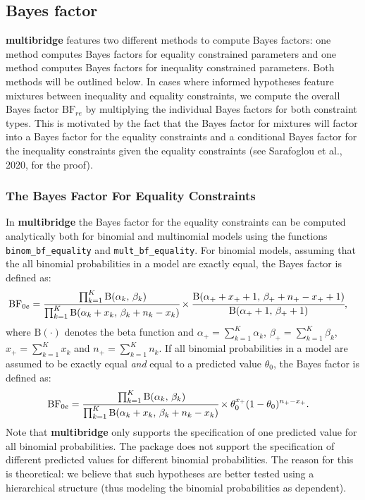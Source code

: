 \documentclass[
  english,
  man,floatsintext]{apa6}
\begin{document}
\hypertarget{bayes-factor}{%
\subsection{Bayes factor}\label{bayes-factor}}

\noindent \textbf{multibridge} features two different methods to compute Bayes factors: one method computes Bayes factors for equality constrained parameters and one method computes Bayes factors for inequality constrained parameters. Both methods will be outlined below. In cases where informed hypotheses feature mixtures between inequality and equality constraints, we compute the overall Bayes factor \(\text{BF}_{re}\) by multiplying the individual Bayes factors for both constraint types. This is motivated by the fact that the Bayes factor for mixtures will factor into a Bayes factor for the equality constraints and a conditional Bayes factor for the inequality constraints given the equality constraints (see Sarafoglou et al., 2020, for the proof).

\hypertarget{the-bayes-factor-for-equality-constraints}{%
\subsubsection{The Bayes Factor For Equality Constraints}\label{the-bayes-factor-for-equality-constraints}}

\noindent In \textbf{multibridge} the Bayes factor for the equality constraints can be computed analytically both for binomial and multinomial models using the functions \texttt{binom\_bf\_equality} and \texttt{mult\_bf\_equality}. For binomial models, assuming that the all binomial probabilities in a model are exactly equal, the Bayes factor is defined as:
\begin{align*}
\text{BF}_{0e}
&= \cfrac{\prod_{k=1}^K \text{B}(\alpha_k \text{, } \beta_k)}{\prod_{k=1}^K \text{B}(\alpha_k + x_k\text{, } \beta_k + n_k - x_k)} \times \cfrac{\text{B}(\alpha_+ + x_+ + 1\text{, } \beta_+ + n_+ - x_+ + 1)}{\text{B}(\alpha_+ + 1\text{, }\beta_+ + 1)},
\end{align*}
where \(\text{B}(\cdot)\) denotes the beta function and \(\alpha_+ = \sum_{k=1}^K\alpha_k\), \(\beta_+ = \sum_{k=1}^K\beta_k\), \(x_+ = \sum_{k=1}^K x_k\) and \(n_+ = \sum_{k=1}^K n_k\). If all binomial probabilities in a model are assumed to be exactly equal \textit{and} equal to a predicted value \(\theta_{0}\), the Bayes factor is defined as:
\begin{align*}
\text{BF}_{0e}
&= \cfrac{\prod_{k=1}^K \text{B}(\alpha_k \text{, } \beta_k)}{\prod_{k=1}^K \text{B}(\alpha_k + x_k\text{, } \beta_k + n_k - x_k)} \times \theta_{0}^{x_+} (1 - \theta_{0})^{n_+ - x_+}.
\end{align*}
Note that \textbf{multibridge} only supports the specification of one predicted value for all binomial probabilities. The package does not support the specification of different predicted values for different binomial probabilities. The reason for this is theoretical: we believe that such hypotheses are better tested using a hierarchical structure (thus modeling the binomial probabilities as dependent).
\end{document}
